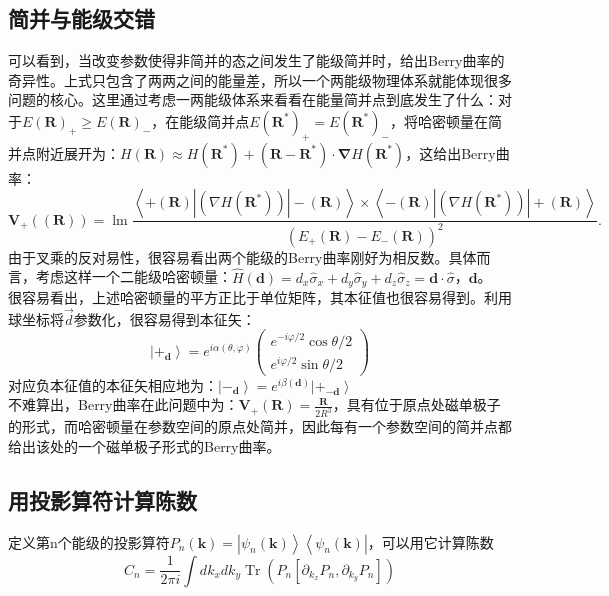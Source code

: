 \documentclass[10pt,openany]{book}
\theoremstyle{thmstyle} %
\theoremstyle{defstyle} %
\theoremstyle{prostyle} %
\begin{document}
\subsection{简并与能级交错}
可以看到，当改变参数使得非简并的态之间发生了能级简并时，给出Berry曲率的奇异性。上式只包含了两两之间的能量差，所以一个两能级物理体系就能体现很多问题的核心。这里通过考虑一两能级体系来看看在能量简并点到底发生了什么：对于$ E(\mathbf{R})_+\geq E(\mathbf{R})_- $，在能级简并点$ E(\mathbf{R^*})_+=E(\mathbf{R^*})_- $，将哈密顿量在简并点附近展开为：$H(\mathbf{R}) \approx H\left(\mathbf{R}^*\right)+\left(\mathbf{R}-\mathbf{R}^*\right) \cdot \boldsymbol{\nabla} H\left(\mathbf{R}^*\right)$，这给出Berry曲率：
\begin{equation}
	\mathbf{V}_{+}((\mathbf{R}))=\operatorname{lm} \frac{\left\langle+(\mathbf{R})\left|\left(\nabla H\left(\mathbf{R}^*\right)\right)\right|-(\mathbf{R})\right\rangle \times\left\langle-(\mathbf{R})\left|\left(\nabla H\left(\mathbf{R}^*\right)\right)\right|+(\mathbf{R})\right\rangle}{\left(E_{+}(\mathbf{R})-E_{-}(\mathbf{R})\right)^2} .
\end{equation} 
由于叉乘的反对易性，很容易看出两个能级的Berry曲率刚好为相反数。具体而言，考虑这样一个二能级哈密顿量：$ \hat{H}(\mathbf{d})=d_x \hat{\sigma}_x+d_y \hat{\sigma}_y+d_z \hat{\sigma}_z=\mathbf{d} \cdot \hat{\sigma} $，$\mathbf{d}$。\\

很容易看出，上述哈密顿量的平方正比于单位矩阵，其本征值也很容易得到。利用球坐标将$ \vec{d} $参数化，很容易得到本征矢：
\begin{equation}
	\left|+_{\mathbf{d}}\right\rangle=e^{i \alpha(\theta, \varphi)}\left(\begin{array}{c}
		e^{-i \varphi / 2} \cos \theta / 2 \\
		e^{i \varphi / 2} \sin \theta / 2
		\end{array}\right)
\end{equation}   
对应负本征值的本征矢相应地为：$ \left|-_{\mathbf{d}}\right\rangle=e^{i \beta(\mathbf{d})}\left|+_{-\mathbf{d}}\right\rangle $\\
不难算出，Berry曲率在此问题中为：$ \mathbf{V}_{+}(\mathbf{R})=\frac{\mathbf{R}}{2 R^3} $，具有位于原点处磁单极子的形式，而哈密顿量在参数空间的原点处简并，因此每有一个参数空间的简并点都给出该处的一个磁单极子形式的Berry曲率。 
\subsection{用投影算符计算陈数}
定义第n个能级的投影算符$ P_n(\mathbf{k})=\left|\psi_n(\mathbf{k})\right\rangle\left\langle\psi_n(\mathbf{k})\right| $，可以用它计算陈数
\begin{equation}
  C_n=\frac{1}{2 \pi i} \int d k_x d k_y \operatorname{Tr}\left(P_n\left[\partial_{k_x} P_n, \partial_{k_y} P_n\right]\right)
\end{equation}
\end{document}
